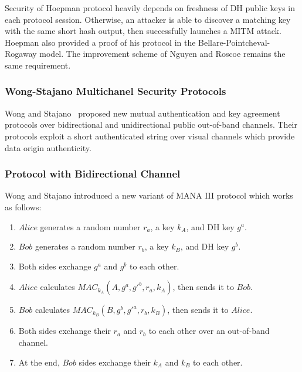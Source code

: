 Security of Hoepman protocol heavily depends on freshness of DH public keys in each protocol session. Otherwise, an attacker is able to discover a matching key with the same short hash output, then successfully launches a MITM attack. Hoepman also provided a proof of his protocol in the Bellare-Pointcheval- Rogaway model. The improvement scheme of Nguyen and Roscoe remains the same requirement. 

\subsubsection{Wong-Stajano Multichanel Security Protocols}\label{WS}

Wong and Stajano~\cite{10.1109/MPRV.2007.76} proposed new mutual authentication and key agreement protocols over bidirectional and unidirectional public out-of-band channels. Their protocols exploit a short authenticated string over visual channels which provide data origin authenticity. 

\subsubsection*{Protocol with Bidirectional Channel}

Wong and Stajano introduced a new variant of MANA III protocol which works as follows:

\begin{enumerate}
\item $Alice$ generates a random number $r_a$, a key $k_A$, and DH key $g^a$.
\item $Bob$ generates a random number $r_b$, a key $k_B$, and DH key $g^b$.
\item Both sides exchange $g^a$ and $g^b$ to each other.
\item $Alice$ calculates $MAC_{k_A}(A,g^a,g'^b,r_a,k_A)$, then sends it to $Bob$. 
\item $Bob$ calculates $MAC_{k_B}(B,g^b,g'^a,r_b,k_B)$, then sends it to $Alice$.
\item Both sides exchange their $r_a$ and $r_b$ to each other over an out-of-band channel. 
\item At the end, $Bob$ sides exchange their $k_A$ and $k_B$ to each other. 
\end{enumerate}

